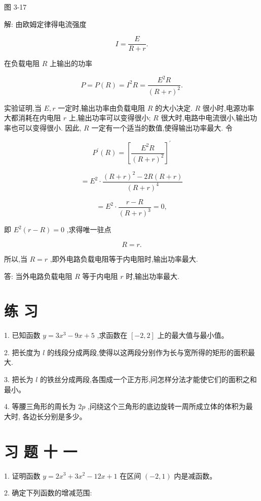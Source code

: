\documentclass[10pt]{article}
\begin{document}
图 3-17

解: 由欧姆定律得电流强度

\[
I = \frac{E}{R + r}.
\]

在负载电阻 \(R\) 上输出的功率

\[
P = P\left( R\right) = {I}^{2}R = \frac{{E}^{2}R}{{\left( R + r\right) }^{2}}.
\]

实验证明,当 \(E,r\) 一定时,输出功率由负载电阻 \(R\) 的大小决定. \(R\) 很小时,电源功率大都消耗在内电阻 \(r\) 上,输出功率可以变得很小; \(R\) 很大时,电路中电流很小,输出功率也可以变得很小. 因此, \(R\) 一定有一个适当的数值,使得输出功率最大. 令

\[
{P}^{\prime }\left( R\right) = {\left\lbrack \frac{{E}^{2}R}{{\left( R + r\right) }^{2}}\right\rbrack }^{\prime }
\]

\[
= {E}^{2} \cdot \frac{{\left( R + r\right) }^{2} - {2R}\left( {R + r}\right) }{{\left( R + r\right) }^{4}}
\]

\[
= {E}^{2} \cdot \frac{r - R}{{\left( R + r\right) }^{3}} = 0,
\]

即 \({E}^{2}\left( {r - R}\right) = 0\) ,求得唯一驻点

\[
R = r\text{.}
\]

所以,当 \(R = r\) ,即外电路负载电阻等于内电阻时,输出功率最大.

答: 当外电路负载电阻 \(R\) 等于内电阻 \(r\) 时,输出功率最大.

\section*{练 习}

1. 已知函数 \(y = 3{x}^{3} - {9x} + 5\) ,求函数在 \(\left\lbrack {-2,2}\right\rbrack\) 上的最大值与最小值。

2. 把长度为 \(l\) 的线段分成两段,使得以这两段分别作为长与宽所得的矩形的面积最大.

3. 把长为 \(l\) 的铁丝分成两段,各围成一个正方形,问怎样分法才能使它们的面积之和最小。

4. 等腰三角形的周长为 \({2p}\) ,问绕这个三角形的底边旋转一周所成立体的体积为最大时, 各边长分别是多少。

\section*{习 题 十 一}

1. 证明函数 \(y = 2{x}^{3} + 3{x}^{2} - {12x} + 1\) 在区间 \(\left( {-2,1}\right)\) 内是减函数。

2. 确定下列函数的增减范围:
\end{document}
